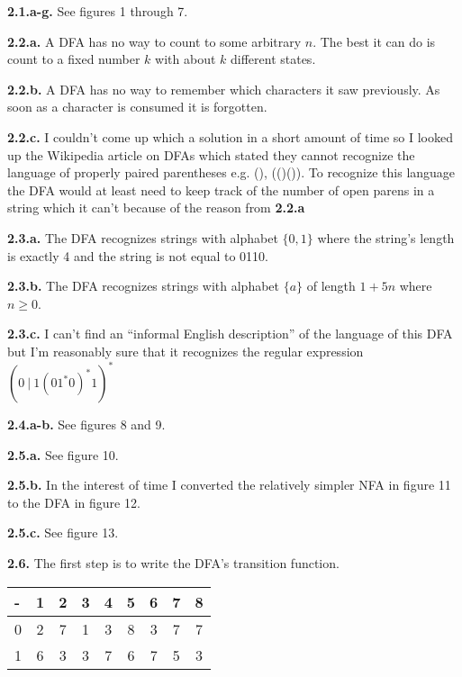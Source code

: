 \documentclass{article}
\begin{document}
\textbf{2.1.a-g.} See figures 1 through 7.

\textbf{2.2.a.} A DFA has no way to count to some arbitrary $n$. The best it can
do is count to a fixed number $k$ with about $k$ different states.

\textbf{2.2.b.} A DFA has no way to remember which characters it saw previously.
As soon as a character is consumed it is forgotten.

\textbf{2.2.c.} I couldn't come up which a solution in a short amount of time
so I looked up the Wikipedia article on DFAs which stated they cannot recognize
the language of properly paired parentheses e.g. (), (()()). To recognize this
language the DFA would at least need to keep track of the number of open parens
in a string which it can't because of the reason from \textbf{2.2.a}

\textbf{2.3.a.} The DFA recognizes strings with alphabet $\{0,1\}$ where the
string's length is exactly 4 and the string is not equal to 0110.

\textbf{2.3.b.} The DFA recognizes strings with alphabet $\{a\}$ of length
$1 + 5n$ where $n \geq 0$.

\textbf{2.3.c.} I can't find an ``informal English description'' of the language
of this DFA but I'm reasonably sure that it recognizes the regular expression
\begin{math}
  {\left( 0\ \vert\ 1 {\left( 0 1^* 0 \right)}^* 1 \right)}^*
\end{math}

\textbf{2.4.a-b.} See figures 8 and 9.

\textbf{2.5.a.} See figure 10.

\textbf{2.5.b.} In the interest of time I converted the relatively simpler NFA
in figure 11 to the DFA in figure 12.

\textbf{2.5.c.} See figure 13.

\textbf{2.6.} The first step is to write the DFA's transition function.

\begin{center}
  \begin{tabular}{a | c | c | c | c | c | c | c | c}
    - & 1 & 2 & 3 & 4 & 5 & 6 & 7 & 8 \\
     & 2 & 7 & 1 & 3 & 8 & 3 & 7 & 7 \\
     & 6 & 3 & 3 & 7 & 6 & 7 & 5 & 3
  \end{tabular}
\end{center}
\end{document}
